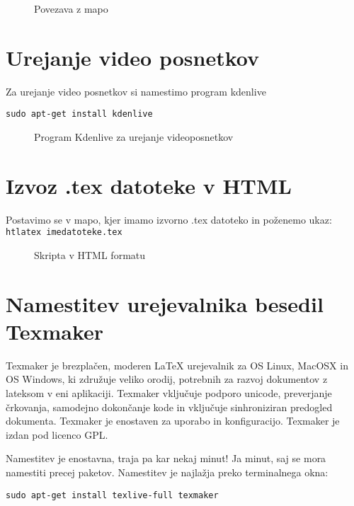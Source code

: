 \documentclass[12pt,a4paper,twoside]{article}
\begin{document}
\begin{figure}[h!] \centering
{}
\caption{Povezava z mapo}\label{slika:Povezava z mapo}
\end{figure}

\newpage
\section{Urejanje video posnetkov}

Za urejanje video posnetkov si namestimo program kdenlive

\texttt{sudo apt-get install kdenlive}


\begin{figure}[h!] \centering
{}
\caption{Program Kdenlive za urejanje videoposnetkov}\label{slika:Program Kdenlive za urejanje videoposnetkov}
\end{figure}



\newpage
\section{Izvoz .tex datoteke v HTML}
Postavimo se v mapo, kjer imamo izvorno .tex datoteko in poženemo ukaz:
\texttt{htlatex imedatoteke.tex}

\begin{figure}[h!] \centering
{}
\caption{Skripta v HTML formatu}\label{slika:Skripta v HTML obliki}
\end{figure}


\section{Namestitev urejevalnika besedil Texmaker}
Texmaker je brezplačen, moderen LaTeX urejevalnik za OS Linux, MacOSX in OS Windows, ki združuje veliko orodij, potrebnih za razvoj dokumentov z lateksom v eni aplikaciji.
Texmaker vključuje podporo unicode, preverjanje črkovanja, samodejno dokončanje kode in vključuje sinhroniziran predogled dokumenta. Texmaker je enostaven za uporabo in konfiguracijo. Texmaker je izdan pod licenco GPL.

Namestitev je enostavna, traja pa kar nekaj minut! Ja minut, saj se mora namestiti precej paketov. Namestitev je najlažja preko terminalnega okna:

\texttt{sudo apt-get install texlive-full texmaker}
\end{document}
